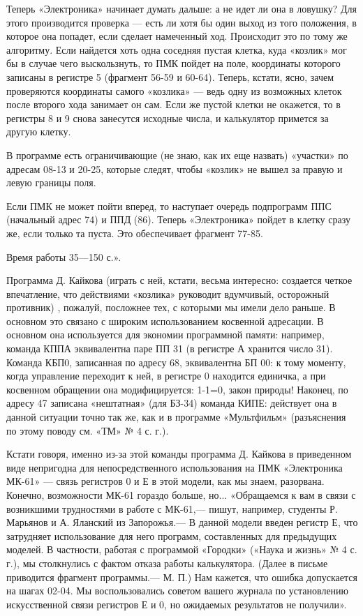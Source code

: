 \documentclass[11pt,a4paper,oneside]{article}
\begin{document}
Теперь «Электроника» начинает думать дальше: а не идет ли она в ловушку? Для этого производится проверка — есть ли хотя бы один выход из того положения, в которое она попадет, если сделает намеченный ход. Происходит это по тому же алгоритму. Если найдется хоть одна соседняя пустая клетка, куда «козлик» мог бы в случае чего выскользнуть, то ПМК пойдет на поле, координаты которого записаны в регистре 5 (фрагмент 56-59 и 60-64). Теперь, кстати, ясно, зачем проверяются координаты самого «козлика» — ведь одну из возможных клеток после второго хода занимает он сам. Если же пустой клетки не окажется, то в регистры 8 и 9 снова занесутся исходные числа, и калькулятор примется за другую клетку.

В программе есть ограничивающие (не знаю, как их еще назвать) «участки» по адресам 08-13 и 20-25, которые следят, чтобы «козлик» не вышел за правую и левую границы поля.

Если ПМК не может пойти вперед, то наступает очередь подпрограмм ППС (начальный адрес 74) и ППД (86). Теперь «Электроника» пойдет в клетку сразу же, если только та пуста. Это обеспечивает фрагмент 77-85.

Время работы 35—150 с.».

Программа Д. Кайкова (играть с ней, кстати, весьма интересно: создается четкое впечатление, что действиями «козлика» руководит вдумчивый, осторожный противник) , пожалуй, посложнее тех, с которыми мы имели дело раньше. В основном это связано с широким использованием косвенной адресации. В основном она используется для экономии программной памяти: например, команда КППА эквивалентна паре ПП 31 (в регистре А хранится число 31). Команда КБП0, записанная по адресу 68, эквивалентна БП 00: к тому моменту, когда управление переходит к ней, в регистре 0 находится единичка, а при косвенном обращении она модифицируется: 1-1=0, закон природы! Наконец, по адресу 47 записана «нештатная» (для БЗ-34) команда КИПЕ: действует она в данной ситуации точно так же, как и в программе «Мультфильм» (разъяснения по этому поводу см. «ТМ» № 4 с. г.).

Кстати говоря, именно из-за этой команды программа Д. Кайкова в приведенном виде непригодна для непосредственного использования на ПМК «Электроника МК-61» — связь регистров 0 и Е в этой модели, как мы знаем, разорвана. Конечно, возможности МК-61 гораздо больше, но... «Обращаемся к вам в связи с возникшими трудностями в работе с МК-61,— пишут, например, студенты Р. Марьянов и А. Яланский из Запорожья.— В данной модели введен регистр Е, что затрудняет использование для него программ, составленных для предыдущих моделей. В частности, работая с программой «Городки» («Наука и жизнь» № 4 с. г.), мы столкнулись с фактом отказа работы калькулятора. (Далее в письме приводится фрагмент программы.— М. П.) Нам кажется, что ошибка допускается на шагах 02-04. Мы воспользовались советом вашего журнала по установлению искусственной связи регистров Е и 0, но ожидаемых результатов не получили».
\end{document}
